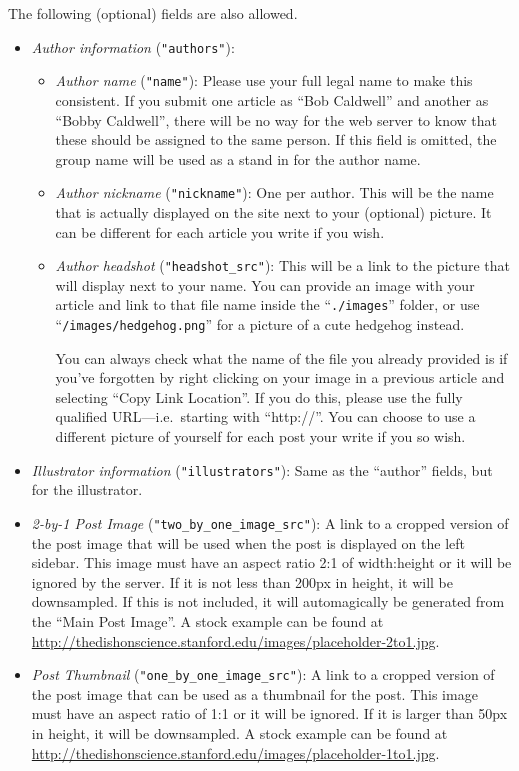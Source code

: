\documentclass[paper=a4, fontsize=11pt]{scrartcl}
\numberwithin{equation}{section}        %
\numberwithin{figure}{section}            %
\numberwithin{table}{section}                %
\newcommand{\dishurlplain}[1]{http://thedishonscience.stanford.edu/#1}
\newcommand{\dishurl}[1]{\url{\dishurlplain{#1}}}
\begin{document}
\noindent{}The following (optional) fields are also allowed.
\begin{itemize}
    \item \emph{Author information} (\texttt{"authors"}):
        \begin{itemize}
            \item \emph{Author name} (\texttt{"name"}): Please use your full legal name to make this consistent. If
                you submit one article as ``Bob Caldwell'' and another as ``Bobby
                Caldwell'', there will be no way for the web server to know that
                these should be assigned to the same person.
                If this field is omitted, the group name will be used as a stand in for
                the author name.
            \item \emph{Author nickname} (\texttt{"nickname"}): One per author. This will be the name that is
                actually displayed on the site next to your (optional) picture. It can
                be different for each article you write if you wish.
            \item \emph{Author headshot} (\texttt{"headshot\_src"}): This will
                be a link to the picture that will display next to your name.
                You can provide an image with your article and link to that
                file name
                inside the ``\texttt{./images}'' folder, or use
                ``\texttt{/images/hedgehog.png}'' for a picture of a cute
                hedgehog instead.

                You can always check what the name of the file you already
                provided is if you've forgotten by right clicking on your image
                in a previous article and selecting ``Copy Link Location''. If
                you do this, please use the fully qualified URL---i.e.\ starting
                with ``http://''. You can choose to use a
                different picture of yourself for each post your write if you so wish.
        \end{itemize}
    \item \emph{Illustrator information} (\texttt{"illustrators"}): Same as
        the ``author'' fields, but for the illustrator.
    \item \emph{2-by-1 Post Image} (\texttt{"two\_by\_one\_image\_src"}): A link to a cropped version of the post image that
        will be used when the post is displayed on the left sidebar. This image
        must have an aspect ratio 2:1 of width:height or it will be ignored by
        the server. If it is not less than
        200px in height, it will be downsampled. If this is not included, it
        will automagically be generated from the ``Main Post Image''. A stock
        example can be found at
        \dishurl{images/placeholder-2to1.jpg}.
    \item \emph{Post Thumbnail} (\texttt{"one\_by\_one\_image\_src"}): A link to a cropped version of the post image
        that can be used as a thumbnail for the post. This image must have an
        aspect ratio of 1:1 or it will be ignored. If it is larger than 50px in
        height, it will be downsampled. A stock
        example can be found at
        \dishurl{images/placeholder-1to1.jpg}.


\end{itemize}
\end{document}
